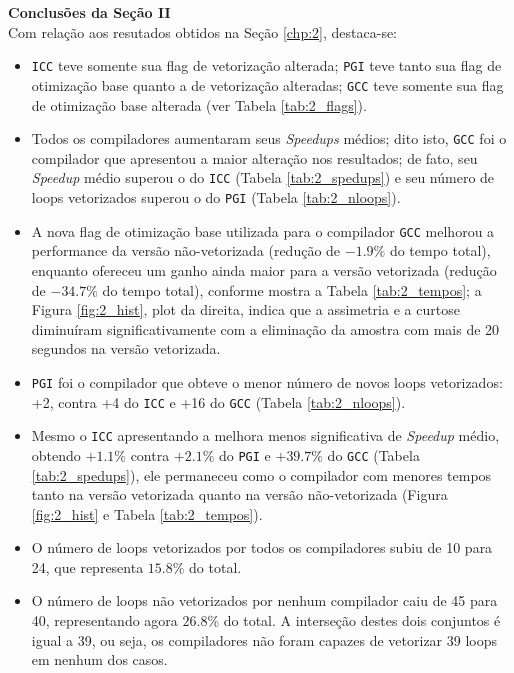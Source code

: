 \textbf{Conclusões da Seção II}\vspace{6mm}\\
Com relação aos resutados obtidos na Seção \ref{chp:2}, destaca-se:
\begin{itemize}
\item \texttt{ICC} teve somente sua flag de vetorização alterada; \texttt{PGI} teve tanto sua flag de otimização base quanto a de vetorização alteradas; \texttt{GCC} teve somente sua flag de otimização base alterada (ver Tabela \ref{tab:2_flags}).
%
\item Todos os compiladores aumentaram seus \textit{Speedups} médios; dito isto, \texttt{GCC} foi o compilador que apresentou a maior alteração nos resultados; de fato, seu \textit{Speedup} médio superou o do \texttt{ICC} (Tabela \ref{tab:2_spedups}) e seu número de loops vetorizados superou o do \texttt{PGI} (Tabela \ref{tab:2_nloops}).
%
\item A nova flag de otimização base utilizada para o compilador \texttt{GCC} melhorou a performance da versão não-vetorizada (redução de $-1.9\%$ do tempo total), enquanto ofereceu um ganho ainda maior para a versão vetorizada (redução de $-34.7\%$ do tempo total), conforme mostra a Tabela \ref{tab:2_tempos}; a Figura \ref{fig:2_hist}, plot da direita, indica que a assimetria e a curtose diminuíram significativamente com a eliminação da amostra com mais de 20 segundos na versão vetorizada.
%
\item \texttt{PGI} foi o compilador que obteve o menor número de novos loops vetorizados: +2, contra +4 do \texttt{ICC} e +16 do \texttt{GCC} (Tabela \ref{tab:2_nloops}).
%
\item Mesmo o \texttt{ICC} apresentando a melhora menos significativa de \textit{Speedup} médio, obtendo $+1.1\%$ contra $+2.1\%$ do \texttt{PGI} e $+39.7\%$ do \texttt{GCC} (Tabela \ref{tab:2_spedups}), ele permaneceu como o compilador com menores tempos tanto na versão vetorizada quanto na versão não-vetorizada (Figura \ref{fig:2_hist} e Tabela \ref{tab:2_tempos}). 
%
\item O número de loops vetorizados por todos os compiladores subiu de 10 para 24, que representa $15.8\%$ do total. 
%
\item O número de loops não vetorizados por nenhum compilador caiu de 45 para 40, representando agora $26.8\%$ do total. A interseção destes dois conjuntos é igual a 39, ou seja, os compiladores não foram capazes de vetorizar 39 loops em nenhum dos casos.
\end{itemize}
